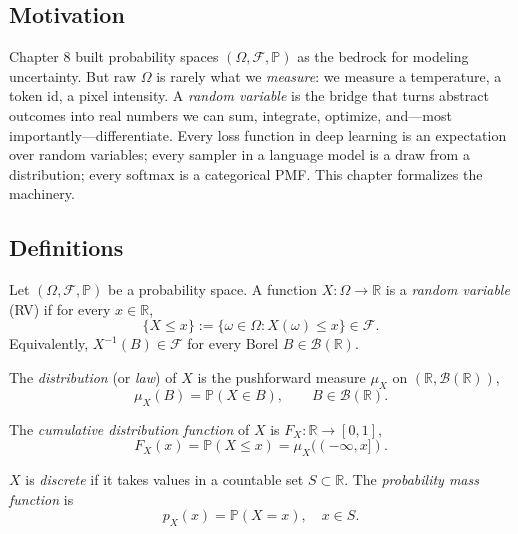 \subsection*{Motivation}

Chapter 8 built probability spaces $(\Omega, \mathcal{F}, \mathbb{P})$ as the bedrock for modeling uncertainty. But raw $\Omega$ is rarely what we \emph{measure}: we measure a temperature, a token id, a pixel intensity. A \emph{random variable} is the bridge that turns abstract outcomes into real numbers we can sum, integrate, optimize, and---most importantly---differentiate. Every loss function in deep learning is an expectation over random variables; every sampler in a language model is a draw from a distribution; every softmax is a categorical PMF. This chapter formalizes the machinery.

\subsection*{Definitions}

\begin{definition}
Let $(\Omega, \mathcal{F}, \mathbb{P})$ be a probability space. A function $X: \Omega \to \mathbb{R}$ is a \emph{random variable} (RV) if for every $x \in \mathbb{R}$,
\[
\{X \leq x\} := \{\omega \in \Omega : X(\omega) \leq x\} \in \mathcal{F}.
\]
Equivalently, $X^{-1}(B) \in \mathcal{F}$ for every Borel $B \in \mathcal{B}(\mathbb{R})$.
\end{definition}

\begin{definition}[Distribution]
The \emph{distribution} (or \emph{law}) of $X$ is the pushforward measure $\mu_X$ on $(\mathbb{R}, \mathcal{B}(\mathbb{R}))$,
\[
\mu_X(B) = \mathbb{P}(X \in B), \qquad B \in \mathcal{B}(\mathbb{R}).
\]
\end{definition}

\begin{definition}[CDF]
The \emph{cumulative distribution function} of $X$ is $F_X : \mathbb{R} \to [0,1]$,
\[
F_X(x) = \mathbb{P}(X \leq x) = \mu_X((-\infty, x]).
\]
\end{definition}

\begin{definition}
$X$ is \emph{discrete} if it takes values in a countable set $S \subset \mathbb{R}$. The \emph{probability mass function} is
\[
p_X(x) = \mathbb{P}(X = x), \quad x \in S.
\]
\end{definition}

